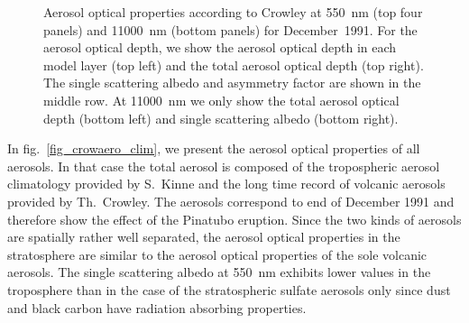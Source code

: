 \begin{appendix}
\begin{figure}
\vspace{-3.5cm}
\pctsix
{\vspace{-2.7cm}\hspace{-1cm}}
{\vspace{-2.7cm}}
{\vspace{-2.7cm}\hspace{-1cm}}
{\vspace{-2.7cm}}
{\vspace{-0.7cm}\hspace{-1cm}}
{\vspace{-0.7cm}}
\caption{Aerosol optical properties according to Crowley at 550~nm
  (top four panels) and 11000~nm (bottom panels) for
  December~1991. For the aerosol optical depth, we show the aerosol
  optical depth in each model layer (top left) and the total aerosol
  optical depth (top right). The single scattering albedo and
  asymmetry factor are shown in the middle row. At 11000~nm we only
  show the total aerosol optical depth (bottom left) and single
  scattering albedo (bottom right).}\label{fig_crow}
\end{figure}

In fig.~\ref{fig_crowaero_clim}, we present the aerosol optical
properties of all aerosols. In that case the total aerosol is composed
of the tropospheric aerosol climatology provided by S.~Kinne
and the long time record of volcanic aerosols provided by
Th.~Crowley. The aerosols correspond to end of December 1991 and
therefore show
the effect of the Pinatubo eruption.
Since the two kinds of aerosols are spatially rather well separated,
the aerosol optical properties in the stratosphere are similar to the
aerosol optical properties of the sole volcanic aerosols.
The single scattering albedo at 550~nm exhibits lower values in the
troposphere than in
the case of the stratospheric sulfate aerosols only since dust and
black carbon have radiation absorbing properties.



\end{appendix}
